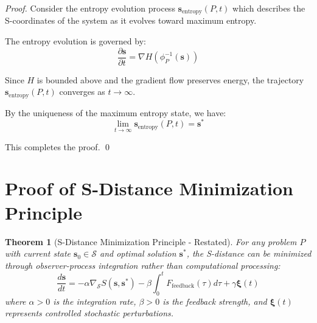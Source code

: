 \documentclass[12pt,a4paper]{article}
\newtheorem{theorem}{Theorem}
\begin{document}
\begin{proof}
Consider the entropy evolution process $\mathbf{s}_{\text{entropy}}(P, t)$ which describes the S-coordinates of the system as it evolves toward maximum entropy.

The entropy evolution is governed by:
\begin{equation}
\frac{\partial \mathbf{s}}{\partial t} = \nabla H(\phi_P^{-1}(\mathbf{s}))
\end{equation}

Since $H$ is bounded above and the gradient flow preserves energy, the trajectory $\mathbf{s}_{\text{entropy}}(P, t)$ converges as $t \to \infty$.

By the uniqueness of the maximum entropy state, we have:
\begin{equation}
\lim_{t \to \infty} \mathbf{s}_{\text{entropy}}(P, t) = \mathbf{s}^*
\end{equation}

This completes the proof. \qed
\end{proof}

\section{Proof of S-Distance Minimization Principle}
\label{proof:s_minimization}

\begin{theorem}[S-Distance Minimization Principle - Restated]
For any problem $P$ with current state $\mathbf{s}_0 \in \mathcal{S}$ and optimal solution $\mathbf{s}^*$, the S-distance can be minimized through observer-process integration rather than computational processing:
\begin{equation}
\frac{d\mathbf{s}}{dt} = -\alpha \nabla_{\mathcal{S}} S(\mathbf{s}, \mathbf{s}^*) - \beta \int_0^t F_{\text{feedback}}(\tau) d\tau + \gamma \mathbf{\xi}(t)
\end{equation}
where $\alpha > 0$ is the integration rate, $\beta > 0$ is the feedback strength, and $\mathbf{\xi}(t)$ represents controlled stochastic perturbations.
\end{theorem}
\end{document}
